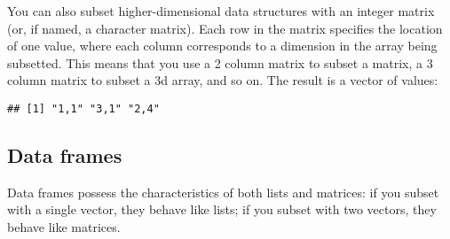 You can also subset higher-dimensional data structures with an integer
matrix (or, if named, a character matrix). Each row in the matrix
specifies the location of one value, where each column corresponds to a
dimension in the array being subsetted. This means that you use a 2
column matrix to subset a matrix, a 3 column matrix to subset a 3d
array, and so on. The result is a vector of values:

\begin{Shaded}
\begin{Highlighting}[]
\StringTok{ }\NormalTok{(}\OperatorTok{:}\NormalTok{, }\OperatorTok{:}\NormalTok{, } \NormalTok{, } \NormalTok{)}
\StringTok{ }\NormalTok{(} \NormalTok{, } \NormalTok{, }\NormalTok{(}
  \NormalTok{, }\NormalTok{,}
  \NormalTok{, }\NormalTok{,}
  \NormalTok{, }
\NormalTok{))}
\end{Highlighting}
\end{Shaded}

\begin{verbatim}
## [1] "1,1" "3,1" "2,4"
\end{verbatim}

\hypertarget{df-subsetting}{%
\subsection{Data frames}\label{df-subsetting}}

Data frames possess the characteristics of both lists and matrices: if
you subset with a single vector, they behave like lists; if you subset
with two vectors, they behave like matrices.
 

\begin{Shaded}
\begin{Highlighting}[]
\StringTok{ }\NormalTok{(} \OperatorTok{:}\NormalTok{, } \OperatorTok{:}\NormalTok{, }\NormalTok{ letters[}\OperatorTok{:}\NormalTok{])}

\NormalTok{df[df}\OperatorTok{$}\OperatorTok{==}\StringTok{ }\NormalTok{, ]}
\end{Highlighting}
\end{Shaded}

